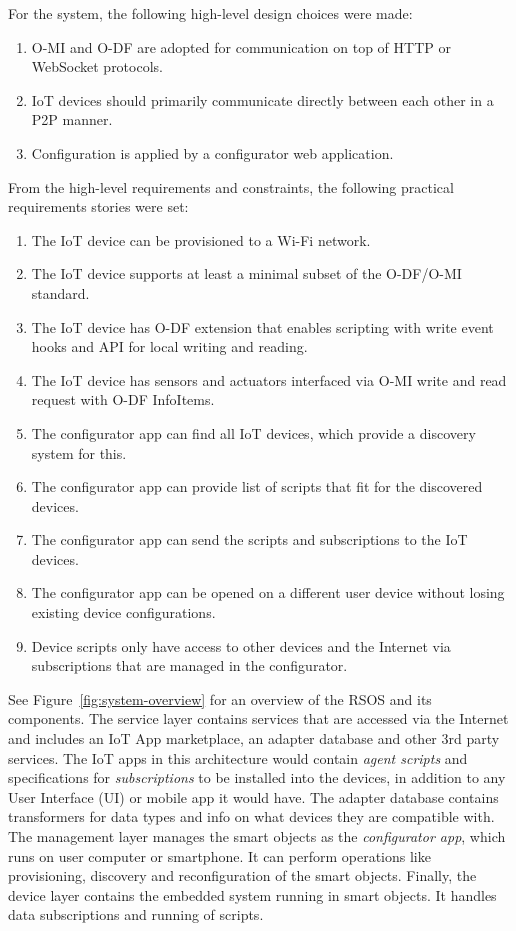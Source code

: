For the system, the following high-level design choices were made: %
\begin{enumerate}
  \item O-MI and O-DF are adopted for communication on top of HTTP or WebSocket protocols.
  \item IoT devices should primarily communicate directly between each other in a P2P manner.
  \item Configuration is applied by a configurator web application.
\end{enumerate}

From the high-level requirements and constraints, the following practical requirements stories were set:
\begin{enumerate}
  \item The IoT device can be provisioned to a Wi-Fi network.
  \item The IoT device supports at least a minimal subset of the O-DF/O-MI standard.
  \item The IoT device has O-DF extension that enables scripting with write event hooks and API for local writing and reading.
  \item The IoT device has sensors and actuators interfaced via O-MI write and read request with O-DF InfoItems.
  \item The configurator app can find all IoT devices, which provide a discovery system for this.
  \item The configurator app can provide list of scripts that fit for the discovered devices.
  \item The configurator app can send the scripts and subscriptions to the IoT devices.
  \item The configurator app can be opened on a different user device without losing existing device configurations.
  \item Device scripts only have access to other devices and the Internet via subscriptions that are managed in the configurator.
\end{enumerate}

See Figure~\ref{fig:system-overview} for an overview of the RSOS and its components. The service layer contains services that are accessed via the Internet and includes an IoT App marketplace, an adapter database and other 3rd party services. The IoT apps in this architecture would contain \emph{agent scripts} and specifications for \emph{subscriptions} to be installed into the devices, in addition to any User Interface (UI) or mobile app it would have. The adapter database contains transformers for data types and info on what devices they are compatible with. The management layer manages the smart objects as the \emph{configurator app}, which runs on user computer or smartphone. It can perform operations like provisioning, discovery and reconfiguration of the smart objects. Finally, the device layer contains the embedded system running in smart objects. It handles data subscriptions and running of scripts.

